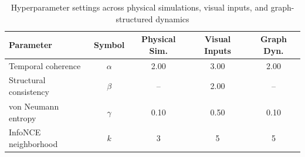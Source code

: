 \documentclass{article} %
\begin{document}



\begin{table}[h]
\centering
\caption{Hyperparameter settings across physical simulations, visual inputs, and graph-structured dynamics}
\label{tab:hyperparameters_all}
\begin{tabular}{lcccc}
\toprule
\textbf{Parameter} & \textbf{Symbol} & \textbf{Physical Sim.} & \textbf{Visual Inputs} & \textbf{Graph Dyn.} \\
\midrule
Temporal coherence      & $\alpha$ & 2.00 & 3.00 & 2.00 \\
Structural consistency  & $\beta$  & --   & 2.00 & --   \\
von Neumann entropy     & $\gamma$ & 0.10 & 0.50 & 0.10 \\
InfoNCE neighborhood    & $k$      & 3    & 5    & 5    \\
\bottomrule
\end{tabular}
\end{table}
\end{document}
